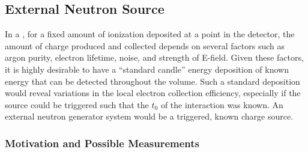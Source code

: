 \subsection{External Neutron Source}\label{sec:neutron}
In a , for a fixed amount of ionization deposited at a point in the detector, the amount of charge produced and collected depends on several factors such as argon purity, electron lifetime, noise, and strength of E-field. Given these factors, it is highly desirable to have a ``standard candle'' energy deposition of known energy that can be detected throughout the volume. Such a standard deposition would reveal variations in the local electron collection efficiency, especially if the source could be triggered such that the $t_0$ of the interaction was known. %
An external neutron generator system would be a triggered, known charge source.

\subsubsection{Motivation and Possible Measurements}


